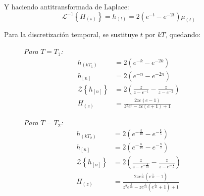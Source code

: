 \documentclass[a4paper,12pt]{report}
\begin{document}
\begin{enumerate}[label=\alph*), left=0pt]
                Y haciendo antitransformada de Laplace:
                \begin{equation*}
                  \mathcal{L}^{-1}\left\{H_{(s)}\right\} = h_{(t)} = 2 \left(e^{-t} - e^{-2 t}\right)\mu_{(t)}
                \end{equation*}

                Para la discretización temporal, se sustituye $t$ por $kT$, quedando:
                \begin{figure}[!h]
                    \centering
                    \begin{minipage}{0.4\textwidth}
                        \centering
                        \textit{Para $T = T_1$:}
                        \begin{align*}
                            h_{(kT_1)} &= 2\left(e^{-k} - e^{-2 k}\right)\\
                            h_{[n]} &= 2\left(e^{-n} - e^{-2 n}\right)\\
                            \mathcal{Z}\left\{h_{[n]}\right\} &= 2\left(\frac{z}{z - e^{-1}} - \frac{z}{z - e^{-2}} \right)\\
                            H_{(z)} &= \frac{2 z e (e - 1)}{z^2 e^3 - z e (e + 1) + 1}
                        \end{align*}
                    \end{minipage}
                    \hspace{0.5cm}
                    \centering
                    \begin{minipage}{0.4\textwidth}
                        \centering
                        \textit{Para $T = T_2$:}
                        \begin{align*}
                            h_{(kT_2)} &= 2\left(e^{-\frac{k}{10}} - e^{-\frac{k}{5}}\right)\\
                            h_{[n]} &= 2\left(e^{-\frac{n}{10}} - e^{-\frac{n}{5}}\right)\\
                            \mathcal{Z}\left\{h_{[n]}\right\} &= 2\left(\frac{z}{z - e^{-\frac{1}{10}}} - \frac{z}{z - e^{-\frac{1}{5}}} \right)\\
                            H_{(z)} &= \frac{2 z e^{\frac{1}{10}} (e^{\frac{1}{10}} - 1)}{z^2 e^{\frac{3}{10}} - z  e^{\frac{1}{10}}(e^{\frac{1}{10}} + 1) + 1}
                        \end{align*}
                    \end{minipage}
                \end{figure}


\end{enumerate}
\end{document}
